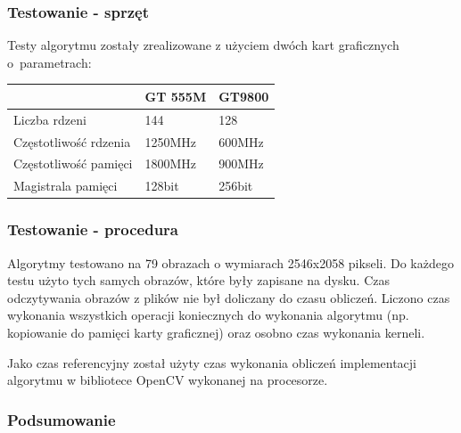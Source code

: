 \documentclass{beamer}
\begin{document}
\begin{frame}
  \frametitle{Testowanie - sprzęt}
  Testy algorytmu zostały zrealizowane z użyciem dwóch kart graficznych o~parametrach:
\begin{center}
   \begin{tabular}{ |l | l | l | }
     \hline
       & GT 555M & GT9800 \\ \hline
     Liczba rdzeni & 144 & 128 \\ \hline
     Częstotliwość rdzenia & 1250MHz & 600MHz \\ \hline
     Częstotliwość pamięci & 1800MHz & 900MHz \\ \hline
     Magistrala pamięci & 128bit & 256bit \\ \hline
   \end{tabular}
\end{center}
\end{frame}
\begin{frame}
  \frametitle{Testowanie - procedura}
  Algorytmy testowano na 79 obrazach o wymiarach 2546x2058 pikseli. Do każdego testu użyto tych samych obrazów, które były zapisane na dysku. Czas odczytywania obrazów z plików nie był doliczany do czasu obliczeń. Liczono czas wykonania wszystkich operacji koniecznych do wykonania algorytmu (np. kopiowanie do pamięci karty graficznej) oraz osobno czas wykonania kerneli.

Jako czas referencyjny został użyty czas wykonania obliczeń implementacji algorytmu w bibliotece OpenCV wykonanej na procesorze.
\end{frame}
\begin{frame}
  \frametitle{Podsumowanie}
  
\end{frame}
\end{document}
